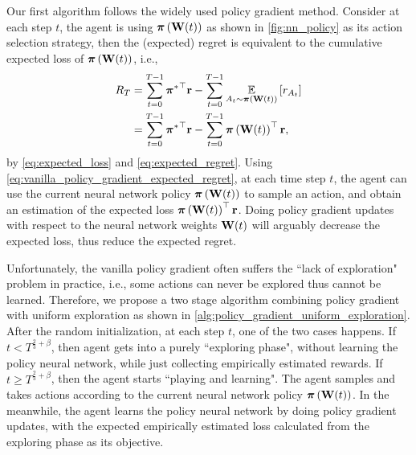 Our first algorithm follows the widely used policy gradient method. 
Consider at each step $t$, the agent is using ${\boldsymbol{\pi}}\left({\mathbf{W}}(t)\right)$ as shown in \cref{fig:nn_policy} as its action selection strategy, then the (expected) regret is equivalent to the cumulative expected loss of ${\boldsymbol{\pi}}\left({\mathbf{W}}(t)\right)$, i.e., 
\begin{equation}
\label{eq:vanilla_policy_gradient_expected_regret}
\begin{split}
    R_T &= \sum\limits_{t=0}^{T-1}{{{\boldsymbol{\pi}}^*}^\top {\mathbf{r}}} - \sum\limits_{t=0}^{T-1}{ \operatorname*{{\mathbb{E}}}\limits_{A_t \sim {\boldsymbol{\pi}}\left({\mathbf{W}}(t)\right)} \left[ r_{A_t} \right] } \\
    &= \sum\limits_{t=0}^{T-1}{{{\boldsymbol{\pi}}^*}^\top {\mathbf{r}}} - \sum\limits_{t=0}^{T-1}{{\boldsymbol{\pi}}\left({\mathbf{W}}(t)\right)^\top {\mathbf{r}}},
\end{split}
\end{equation}
by \cref{eq:expected_loss} and \cref{eq:expected_regret}. Using \cref{eq:vanilla_policy_gradient_expected_regret}, at each time step $t$, the agent can use the current neural network policy ${\boldsymbol{\pi}}\left({\mathbf{W}}(t)\right)$ to sample an action, and obtain an estimation of the expected loss ${\boldsymbol{\pi}}\left({\mathbf{W}}(t)\right)^\top {\mathbf{r}}$. Doing policy gradient updates with respect to the neural network weights ${\mathbf{W}}(t)$ will arguably decrease the expected loss, thus reduce the expected regret. 

Unfortunately, the vanilla policy gradient often suffers the ``lack of exploration" problem in practice, i.e., some actions can never be explored thus cannot be learned. Therefore, we propose a two stage algorithm combining policy gradient with uniform exploration as shown in \cref{alg:policy_gradient_uniform_exploration}. After the random initialization, at each step $t$, one of the two cases happens. If $t < T^{\frac{2}{3} + \beta}$, then agent gets into a purely ``exploring phase", without learning the policy neural network, while just collecting empirically estimated rewards. If $t \ge T^{\frac{2}{3} + \beta}$, then the agent starts ``playing and learning". The agent samples and takes actions according to the current neural network policy ${\boldsymbol{\pi}}\left({\mathbf{W}}(t)\right)$. In the meanwhile, the agent learns the policy neural network by doing policy gradient updates, with the expected empirically estimated loss calculated from the exploring phase as its objective.

